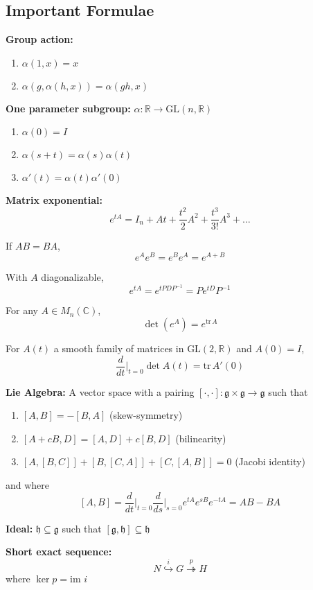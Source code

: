 \documentclass[12pt]{article}
\newcommand{\R}{\mathbb{R}}
\newcommand{\C}{\mathbb{C}}
\newcommand{\GL}{\text{GL}}
\newcommand{\tr}{\text{tr}\,}
\newcommand{\g}{\mathfrak{g}}
\newcommand{\h}{\mathfrak{h}}
\begin{document}
\pagebreak  
\begin{multicols}{2}

\section{Important Formulae}
\textbf{Group action:}
\begin{enumerate}
    \item $\alpha(1, x) = x$
    \item $\alpha(g, \alpha(h, x)) = \alpha(gh, x)$
\end{enumerate}

\textbf{One parameter subgroup:} $\alpha: \R \to \GL(n, \R)$ 
\begin{enumerate}
    \item $\alpha(0) = I$
    \item $\alpha(s + t) = \alpha(s)\alpha(t)$
    \item $\alpha'(t) = \alpha(t) \alpha'(0)$
\end{enumerate}

\textbf{Matrix exponential:}
\[e^{tA} = I_n + At + \frac{t^2}{2}A^2 + \frac{t^3}{3!}A^3 + \dots\]

If $AB = BA$, 
\[e^A e^B = e^B e^A = e^{A+B}\]

With $A$ diagonalizable, 
\[e^{tA} = e^{tPDP^{-1}} = Pe^{tD}P^{-1}\]

For any $A \in M_n(\C)$, 
\[\det(e^A) = e^{\tr A}\]

For $A(t)$ a smooth family of matrices in $\GL(2, \R)$ and $A(0) = I$, 
\[\frac{d}{dt}\bigg\vert_{t=0} \det A(t) = \tr A'(0)\]

\textbf{Lie Algebra:} A vector space with a pairing $[\cdot, \cdot]: \g \times \g \to \g$ such that
\begin{enumerate}
    \item $[A, B] = -[B, A]$ (skew-symmetry)
    \item $[A + cB, D] = [A, D] + c[B, D]$ (bilinearity)
    \item $[A, [B, C]] + [B, [C, A]] + [C, [A, B]] = 0$ (Jacobi identity)
\end{enumerate}
and where 
\[[A, B] = \frac{d}{dt}\bigg\vert_{t=0} \frac{d}{ds}\bigg\vert_{s = 0} e^{tA} e^{sB} e^{-tA} = AB - BA\]

\textbf{Ideal:} $\h \subseteq \g$ such that $[\g, \h] \subseteq \h$

\textbf{Short exact sequence:} 
\[N \overset{i}{\hookrightarrow} G \overset{p}{\twoheadrightarrow} H\] 
where $\ker p = \text{im } i$ 


\end{multicols}
\end{document}
